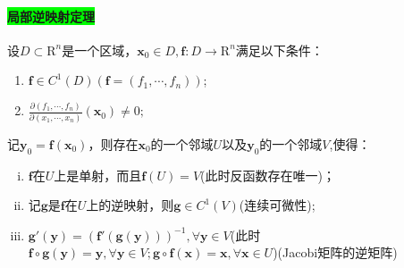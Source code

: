 \documentclass[UTF8]{ctexart}
\newcommand{\p}[2]{\frac{\partial #1}{\partial #2}}
\begin{document}
    \paragraph{\colorbox{lime}{局部逆映射定理}}设$D\subset \mathrm{R}^n$是一个区域，$\boldsymbol{x}_0\in D,\boldsymbol{f}:D\rightarrow \mathrm{R}^n$满足以下条件：
    \begin{enumerate}[(1)]
        \item $\boldsymbol{f}\in C^1(D)(\boldsymbol{f}=(f_1,\cdots,f_n))$;
        \item $\p{(f_1,\cdots,f_n)}{(x_1,\cdots,x_n)}(\boldsymbol{x}_0)\not=0;$
    \end{enumerate}
    记$\boldsymbol{y}_0=\boldsymbol{f}(\boldsymbol{x}_0)$，则存在$\boldsymbol{x}_0$的一个邻域$U$以及$\boldsymbol{y}_0$的一个邻域$V$,使得：
    \begin{enumerate}[(i)]
        \item $\boldsymbol{f}$在$U$上是单射，而且$\boldsymbol{f}(U)=V$(此时反函数存在唯一)；
        \item 记$\boldsymbol{g}$是$\boldsymbol{f}$在$U$上的逆映射，则$\boldsymbol{g}\in C^1(V)$(连续可微性);
        \item $\boldsymbol{g}'(\boldsymbol{y})=(\boldsymbol{f}'(\boldsymbol{g}(\boldsymbol{y})))^{-1},\forall\boldsymbol{y}\in V$(此时$\boldsymbol{f}\circ\boldsymbol{g}(\boldsymbol{y})=\boldsymbol{y},\forall\boldsymbol{y}\in V;\boldsymbol{g}\circ\boldsymbol{f}(\boldsymbol{x})=\boldsymbol{x},\forall\boldsymbol{x}\in U$)(Jacobi矩阵的逆矩阵)
    \end{enumerate}
\end{document}
